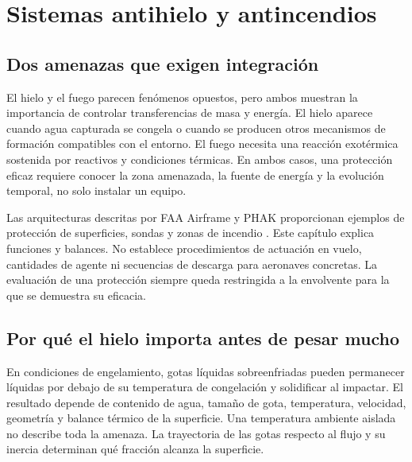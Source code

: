 \chapter{Sistemas antihielo y antincendios}\label{ch:24}

\section{Dos amenazas que exigen integración}
El hielo y el fuego parecen fenómenos opuestos, pero ambos muestran la importancia de controlar transferencias de masa y energía. El hielo aparece cuando agua capturada se congela o cuando se producen otros mecanismos de formación compatibles con el entorno. El fuego necesita una reacción exotérmica sostenida por reactivos y condiciones térmicas. En ambos casos, una protección eficaz requiere conocer la zona amenazada, la fuente de energía y la evolución temporal, no solo instalar un equipo.

Las arquitecturas descritas por FAA Airframe y PHAK proporcionan ejemplos de protección de superficies, sondas y zonas de incendio \cite{FAA-AIRFRAME,PHAK}. Este capítulo explica funciones y balances. No establece procedimientos de actuación en vuelo, cantidades de agente ni secuencias de descarga para aeronaves concretas. La evaluación de una protección siempre queda restringida a la envolvente para la que se demuestra su eficacia.


\section{Por qué el hielo importa antes de pesar mucho}
En condiciones de engelamiento, gotas líquidas sobreenfriadas pueden permanecer líquidas por debajo de su temperatura de congelación y solidificar al impactar. El resultado depende de contenido de agua, tamaño de gota, temperatura, velocidad, geometría y balance térmico de la superficie. Una temperatura ambiente aislada no describe toda la amenaza. La trayectoria de las gotas respecto al flujo y su inercia determinan qué fracción alcanza la superficie.

